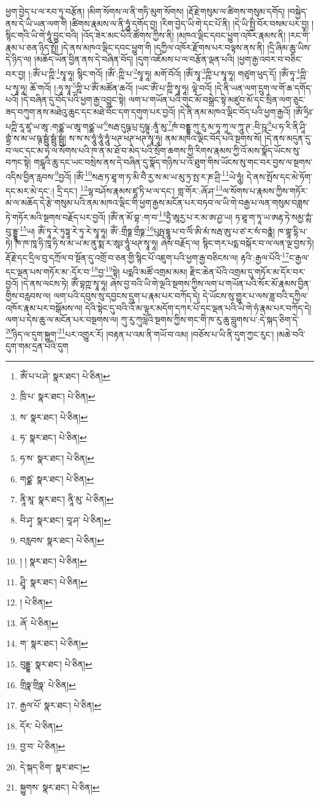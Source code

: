 ཕྱག་བྱེད་པ་ལ་རབ་ཏུ་བརྩོན། །མིག་སོགས་ལ་ནི་གཏི་མུག་སོགས། །རྡོ་རྗེ་གསུམ་ལ་ཚིགས་གསུམ་དགོད། །བསྐྱེད་ནས་དེ་ཡི་ཡན་ལག་གི །ཚིགས་རྣམས་ལ་ནི་ཧཱུཾ་དགོད་བྱ། །རིག་བྱེད་ཡི་གེ་དང་པོ་ནི། །དེ་ཡི་སྤྱི་བོར་བསམ་པར་བྱ། །སྙིང་གའི་ཡི་གེ་ཧཱུཾ་བྱུང་བའི། །འོད་ཟེར་མང་པོའི་ཚོགས་ཀྱིས་ནི། །མཁའ་ལྡིང་དབང་ཕྱུག་འཁོར་རྣམས་ནི། །རང་གི་རྣམ་པ་ཅན་ཉིད་སྤྲོ། །དེ་ནས་མཁའ་ལྡིང་དབང་ཕྱུག་གི །དཀྱིལ་འཁོར་རྫོགས་པར་བལྟས་ནས་ནི། །དྲི་ཞིམ་ཆུ་ཡིས་དེ་ཉིད་ལ། །མཆོད་ཡོན་བྱིན་ནས་དེ་བཞིན་བོད། །དུག་འཇོམས་པ་ལ་བརྩོན་ལྡན་པའི། །ཕྱག་རྒྱ་འབར་བ་བཅིང་བར་བྱ། །:ཨོཾ་པ་ཀྵི་\footnote{ཨོཾ་པ་པ་ཤེ་  སྣར་ཐང་།  པེ་ཅིན། }སྭཱ་ཧཱ། སྙིང་གའོ། །ཨོཾ་:ཀྵི་པ་\footnote{ཁྲི་པ་  སྣར་ཐང་།  པེ་ཅིན། }སྭཱ་ཧཱ། མགོ་བོའོ། །ཨོཾ་སྭཱ་\footnote{ས་  སྣར་ཐང་།  པེ་ཅིན། }ཀྵི་པ་སྭཱ་ཧཱ། གཙུག་ཕུད་དོ། །ཨོཾ་ཧཱ་\footnote{ཧ་  སྣར་ཐང་།  པེ་ཅིན། }ཀྵི་པ་སྭཱ་ཧཱ། ཆོ་གའོ། །:ཧཱ་སྭཱ་\footnote{ཧ་ས་  སྣར་ཐང་།  པེ་ཅིན། }ཀྵི་པ་ཨོཾ་མཚོན་ཆའོ། །ཡང་ཨོཾ་པ་ཀྵི་སྭཱ་ཧཱ། ལྟེ་བའོ། །དེ་ནི་ཡན་ལག་དྲུག་ལ་གོ་ཆ་དགོད་པའོ། །དེ་བཞིན་དུ་བོད་པའི་ཕྱག་རྒྱ་འབྱུང་སྟེ། ལག་པ་གཡོན་པའི་གུང་མོ་བསྒྲེང་སྟེ་མཛུབ་མོ་དང་སྲིན་ལག་ཅུང་ཟད་བཀུག་ནས་མཐེའུ་ཆུང་དང་མཐེ་བོང་དག་དགུག་པར་བྱའོ། །དེ་ནི་ནམ་མཁའ་ལྡིང་བོད་པའི་ཕྱག་རྒྱའོ། །ཨོཾ་ཧྲིཿ་པཀྵི་རཱ་ཛཱ་ཡ་ཨཱ་:གཙྪ་ཡ་ཨཱ་གཙྪ་ཡ་\footnote{གཙྪ་  སྣར་ཐང་།  པེ་ཅིན། }སརྦ་དུཥྚ་པྲ་དུཥྚཱ་:ནཱཾ་མུ་\footnote{ནཱི་མཱ་  སྣར་ཐང་། ནཱི་མུ་  པེ་ཅིན། }ཁཾ་བནྡྷ་ཀུ་རུ་མ་ཧཱ་ཀཱ་ལ་ཀཱུ་ཊ་:བི་ཥཱ་\footnote{བི་ཤྭ་  སྣར་ཐང་། བཱ་ཤ་  པེ་ཅིན། }པ་ཧ་རི་ནི་ཤཱི་གྷྲཾ་ས་མ་ཡ་ཥྚ་སྦྲུཾ་སྦྲུཾ་སྦྲུཾ། ས་ས་ས་ཧཱུཾ་ཧཱུཾ་ཧཱུཾ་ཕཊ་ཕཊ་ཕཊ་སྭཱ་ཧཱ། ནམ་མཁའ་ལྡིང་བོད་པའི་སྔགས་སོ། །དེ་ནས་མདུན་དུ་བ་ལང་དང་མ་ཧེ་ལ་སོགས་པའི་ཁ་ན་མ་ཐོ་བ་མེད་པའི་སྲོག་ཆགས་ཀྱི་རིགས་རྣམས་ཀྱི་འོ་མས་སྣོད་ཡོངས་སུ་བཀང་སྟེ། གངྒཱའི་ཆུ་དང་ཡང་བསྲེས་ནས་དེ་བཞིན་དུ་སྣོད་གཉིས་པ་འོ་ཐུག་གིས་ཡོངས་སུ་གང་བར་བྱས་ལ་སྔགས་འདིས་བྱིན་རླབས་\footnote{བརླབས་  སྣར་ཐང་།  པེ་ཅིན། }བྱའོ། །ཨོཾ་\footnote{། །  སྣར་ཐང་།  པེ་ཅིན། }སརྦ་ཏ་ཐཱ་ག་ཏ་མི་བཻ་རྱ་ས་མ་ཡ་མུ་ཏྲ་སྤ་ར་ཎ་ཤྲི་\footnote{ཤྲཱི་  སྣར་ཐང་།  པེ་ཅིན། }ཡེ་ཧཱུཾ། དེ་ནས་སྤོས་དང་མེ་ཏོག་དང་མར་མེ་དང་:། དྲི་དང་། \footnote{།    པེ་ཅིན། }ལྷ་བཤོས་རྣམས་ཛཱ་ཏི་ཕ་ལ་དང་། གླ་གོར་:ཞོ་ཤ་\footnote{ཞོ་  པེ་ཅིན། }ལ་སོགས་པ་རྣམས་ཀྱིས་གཏོར་མ་ལ་མཆོད་དེ་རྩེ་གསུམ་པའི་ནམ་མཁའ་ལྡིང་གི་ཕྱག་རྒྱས་མངོན་པར་བཏབ་ལ་ཡི་གེ་བརྒྱ་པ་ལན་གསུམ་བཟླས་ཏེ་གཏོར་མའི་སྔགས་བརྗོད་པར་བྱའོ། །ཨོཾ་ན་མོ་བྷ་:ག་བ་\footnote{ག་  སྣར་ཐང་།  པེ་ཅིན། }ཏྱཻ་ཨཱརྱ་པ་ར་མ་ཨ་ཤྱ་ཡ། ཏ་ཐཱ་ག་ཏཱ་ཡ་ཨརྷ་ཏེ་སམྱ་ཀྶཾ་བུ་དྡྷཱ་\footnote{བུདྡྷ་  སྣར་ཐང་།  པེ་ཅིན། }ཡ། ཨོཾ་ཏཱ་རེ་ཏུཏྟཱ་རེ་ཏུ་རེ་སྭཱ་ཧཱ། ཨོཾ་:གྲྀཧྞ་གྲྀཧྞ་\footnote{གྲིཧྣ་གྲིཧྣ་  པེ་ཅིན། }པུཥྤ་དྷཱུ་པ་བ་ལིཾ་ཨི་མཾ་སརྦ་ཨུ་པ་ཙ་ར་སཾ་བནྣཾ། ཁ་གྷཱ་དྷི་པ་ཏེ། ཁ་ཁ་ཁཱ་ཧི་ཁཱ་ཧི་ས་མ་ཡ་མ་ནུ་སྨ་ར་ཨཱཿ་ཧཱུཾ་ཕཊ་སྭཱ་ཧཱ། ཞེས་བརྗོད་ལ། སྙིང་གར་པདྨ་བསྐོར་བ་ལ་ལན་ལྔ་བྱས་ཏེ། རྡོ་རྗེ་དང་དྲིལ་བུ་དཀྲོལ་བ་སྔོན་དུ་འགྲོ་བ་ཅན་གྱི་སྙིང་པོ་འཇུག་པའི་ཕྱག་རྒྱ་བཅིངས་ལ། རྟའི་:རྒྱལ་པོའི་\footnote{རྒྱལ་པོ་  སྣར་ཐང་།  པེ་ཅིན། }ང་རྒྱལ་དང་ལྡན་པས་གཏོར་མ་:དོར་བ་\footnote{དོར་  པེ་ཅིན། }བྱ་\footnote{བྱ་བ་  པེ་ཅིན། }སྟེ། པདྨའི་མཚོ་འགྲམ་མམ། རྫིང་ཆེན་པོའི་འགྲམ་དུ་གཏོར་མ་དོར་བར་བྱའོ། །དེ་ནས་ལངས་ཏེ། ཨོཾ་བྷཀྵ་སྭཱ་ཧཱ། ཞེས་བྱ་བའི་ཡི་གེ་ལྔའི་སྔགས་ཀྱིས་ལག་པ་གཡོན་པའི་སོར་མོ་རྣམས་བྱིན་གྱིས་བརླབས་ལ། ལག་པའི་དབུས་སུ་དབྱངས་དྲུག་པ་རྣམ་པར་བཀོད་དེ། དེ་ཡོངས་སུ་གྱུར་པ་ལས་ཟླ་བའི་དཀྱིལ་འཁོར་རྣམ་པར་བསྒོམས་ལ། དེའི་སྟེང་དུ་བའི་འོ་མ་ལྟར་མདོག་དཀར་པོ་དང་ལྡན་པའི་ཡི་གེ་ཧཾ་རྣམ་པར་བཀོད་དེ། ལག་པ་དེས་ཆུ་ལ་མངོན་པར་བསྔགས་ལ། ཀུ་རུ་ཀུལླེའི་སྔགས་ཀྱིས་གང་གི་ཁ་རུ་ཆུ་བླུགས་པ་:དེ་སྐད་ཅིག་དེ་\footnote{དེ་སྐད་ཅིག་  སྣར་ཐང་། }ཉིད་ལ་དུག་སྐྱུག་\footnote{སྐྱུགས་  སྣར་ཐང་།  པེ་ཅིན། }པར་འགྱུར་རོ། །བརྟན་པ་འམ་ནི་གཡོ་བ་འམ། །བཅོས་པ་ཡི་ནི་དུག་ཀྱང་རུང་། །མཆེ་བའི་དུག་གམ་དྲན་པའི་དུག 